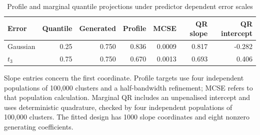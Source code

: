 \begin{table}[t]
\caption{Profile and marginal quantile projections under predictor dependent error scales}\label{tab:conditional-scale-targets}
\begin{tabularx}{\textwidth}{@{}Xrrrrrr@{}}
\toprule
Error & Quantile & Generated & Profile & MCSE & QR slope & QR intercept \\
\midrule
Gaussian & 0.25 & 0.750 & 0.836 & 0.0009 & 0.817 & -0.282 \\
$t_3$ & 0.75 & 0.750 & 0.670 & 0.0013 & 0.693 & 0.406 \\
\bottomrule
\end{tabularx}
\par\smallskip\noindent Slope entries concern the first coordinate. Profile targets use four independent populations of 100{,}000 clusters and a half-bandwidth refinement; MCSE refers to that population calculation. Marginal QR includes an unpenalised intercept and uses deterministic quadrature, checked by four independent populations of 100{,}000 clusters. The fitted design has 1000 slope coordinates and eight nonzero generating coefficients.
\end{table}
